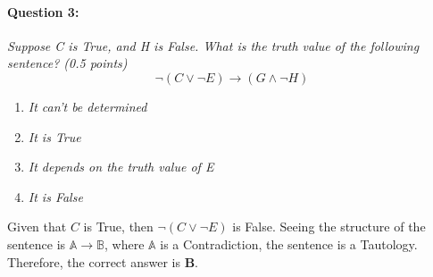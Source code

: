 \documentclass[letterpaper,11pt]{article}
\theoremstyle{mytheor}
\begin{document}
\paragraph{Question 3:} \textit{Suppose C is True, and H is False. What is the truth value of the following sentence? (0.5 points)}
\begin{equation*}
    \neg (C \lor \neg E) \rightarrow (G \land \neg H)
\end{equation*}
\begin{enumerate}[label=\textit{\Alph*:}]
    \item \textit{It can't be determined}
    \item \textit{It is True}
    \item \textit{It depends on the truth value of E}
    \item \textit{It is False}
\end{enumerate}
\begin{framed}
Given that $C$ is True, then $\neg(C \lor \neg E)$ is False. 
Seeing the structure of the sentence is $\mathbb{A} \rightarrow \mathbb{B}$, where $\mathbb{A}$ is a Contradiction, the sentence is a Tautology. Therefore, the correct answer is \textbf{B}.
\end{framed}
\end{document}
